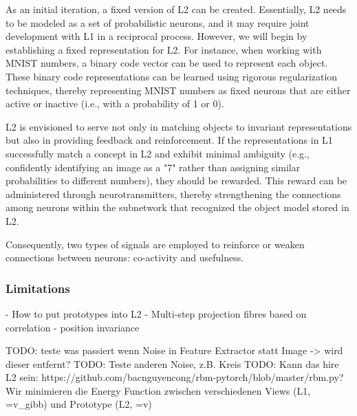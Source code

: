 As an initial iteration, a fixed version of L2 can be created. Essentially, L2 needs to be modeled as a set of probabilistic neurons, and it may require joint development with L1 in a reciprocal process. However, we will begin by establishing a fixed representation for L2. For instance, when working with MNIST numbers, a binary code vector can be used to represent each object. These binary code representations can be learned using rigorous regularization techniques, thereby representing MNIST numbers as fixed neurons that are either active or inactive (i.e., with a probability of 1 or 0).

L2 is envisioned to serve not only in matching objects to invariant representations but also in providing feedback and reinforcement. If the representations in L1 successfully match a concept in L2 and exhibit minimal ambiguity (e.g., confidently identifying an image as a "7" rather than assigning similar probabilities to different numbers), they should be rewarded. This reward can be administered through neurotransmitters, thereby strengthening the connections among neurons within the subnetwork that recognized the object model stored in L2.

Consequently, two types of signals are employed to reinforce or weaken connections between neurons: co-activity and usefulness.


\subsubsection{Limitations}
- How to put prototypes into L2
- Multi-step projection fibres based on correlation
- position invariance





TODO: teste was passiert wenn Noise in Feature Extractor statt Image -> wird dieser entfernt?
TODO: Teste anderen Noise, z.B. Kreis
TODO: Kann das hire L2 sein: https://github.com/bacnguyencong/rbm-pytorch/blob/master/rbm.py? Wir minimieren die Energy Function zwischen verschiedenen Views (L1, =v_gibb) und Prototype (L2, =v)






